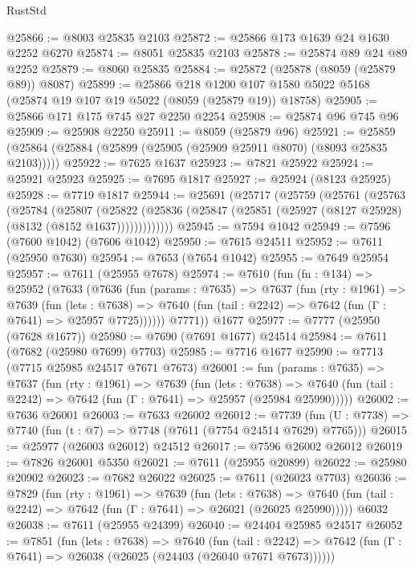 \begin{lexlean}{RustStd}
\begin{coremodule}
{\begin{coremodule}
{{{{{{{{{{{{{{{{{{{{{{{{{{{{{{{{{{@25866 := @8003 @25835 @2103
@25872 := @25866 @173 @1639 @24 @1630 @2252 @6270
@25874 := @8051 @25835 @2103
@25878 := @25874 @89 @24 @89 @2252
@25879 := @8060 @25835
@25884 := @25872 (@25878 (@8059 (@25879 @89)) @8087)
@25899 := @25866
    @218
    @1200
    @107
    @1580
    @5022
    @5168
    (@25874 @19 @107 @19 @5022 (@8059 (@25879 @19)) @18758)
@25905 := @25866 @171 @175 @745 @27 @2250 @2254
@25908 := @25874 @96 @745 @96
@25909 := @25908 @2250
@25911 := @8059 (@25879 @96)
@25921 := @25859 (@25864 (@25884 (@25899 (@25905 (@25909 @25911 @8070) (@8093 @25835 @2103)))))
@25922 := @7625 @1637
@25923 := @7821 @25922
@25924 := @25921 @25923
@25925 := @7695 @1817
@25927 := @25924 (@8123 @25925)
@25928 := @7719 @1817
@25944 := @25691
    (@25717
      (@25759
        (@25761
          (@25763
            (@25784
              (@25807
                (@25822
                  (@25836 (@25847 (@25851 (@25927 (@8127 @25928) (@8132 (@8152 @1637)))))))))))))
@25945 := @7594 @1042
@25949 := @7596 (@7600 @1042) (@7606 @1042)
@25950 := @7615 @24511
@25952 := @7611 (@25950 @7630)
@25954 := @7653 (@7654 @1042)
@25955 := @7649 @25954
@25957 := @7611 (@25955 @7678)
@25974 := @7610
    (fun (fn : @134) =>
    @25952
      (@7633
        (@7636
          (fun (params : @7635) =>
          @7637
            (fun (rty : @1961) =>
            @7639
              (fun (lets : @7638) =>
              @7640 (fun (tail : @2242) => @7642 (fun (Γ : @7641) => @25957 @7725))))))
        @7771))
    @1677
@25977 := @7777 (@25950 (@7628 @1677))
@25980 := @7690 (@7691 @1677) @24514
@25984 := @7611 (@7682 (@25980 @7699) @7703)
@25985 := @7716 @1677
@25990 := @7713 (@7715 @25985 @24517 @7671 @7673)
@26001 := fun (params : @7635) =>
  @7637
    (fun (rty : @1961) =>
    @7639
      (fun (lets : @7638) =>
      @7640 (fun (tail : @2242) => @7642 (fun (Γ : @7641) => @25957 (@25984 @25990)))))
@26002 := @7636 @26001
@26003 := @7633 @26002
@26012 := @7739
    (fun (U : @7738) => @7740 (fun (t : @7) => @7748 (@7611 (@7754 @24514 @7629) @7765)))
@26015 := @25977 (@26003 @26012) @24512
@26017 := @7596 @26002 @26012
@26019 := @7826 @26001 @5350
@26021 := @7611 (@25955 @20899)
@26022 := @25980 @20902
@26023 := @7682 @26022
@26025 := @7611 (@26023 @7703)
@26036 := @7829
    (fun (rty : @1961) =>
    @7639
      (fun (lets : @7638) =>
      @7640 (fun (tail : @2242) => @7642 (fun (Γ : @7641) => @26021 (@26025 @25990)))))
    @6032
@26038 := @7611 (@25955 @24399)
@26040 := @24404 @25985 @24517
@26052 := @7851
    (fun (lets : @7638) =>
    @7640
      (fun (tail : @2242) =>
      @7642 (fun (Γ : @7641) => @26038 (@26025 (@24403 (@26040 @7671 @7673))))))
}}}}}}}}}}}}}}}}}}}}}}}}}}}}}}}}}}
\end{coremodule}}
\end{coremodule}
\end{lexlean}
